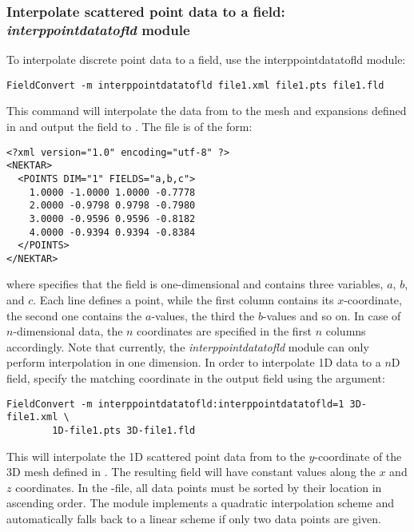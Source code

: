 \subsubsection{Interpolate scattered point data to a field: \textit{interppointdatatofld} module}
To interpolate discrete point data to a field, use the interppointdatatofld module:
%
\begin{lstlisting}[style=BashInputStyle]
FieldConvert -m interppointdatatofld file1.xml file1.pts file1.fld
\end{lstlisting}
%
This command will interpolate the data from  to the mesh
and expansions defined in  and output the field to .
The file  is of the form:
%
\begin{lstlisting}[style=XMLStyle]
<?xml version="1.0" encoding="utf-8" ?>
<NEKTAR>
  <POINTS DIM="1" FIELDS="a,b,c">
    1.0000 -1.0000 1.0000 -0.7778
    2.0000 -0.9798 0.9798 -0.7980
    3.0000 -0.9596 0.9596 -0.8182
    4.0000 -0.9394 0.9394 -0.8384
  </POINTS>
</NEKTAR>
\end{lstlisting}
%
where  specifies that the field is one-dimensional
and contains three variables, $a$, $b$, and $c$.
Each line defines a point, while the  first column contains its $x$-coordinate,
the second one contains the $a$-values, the third the $b$-values and so on.
In case of $n$-dimensional data, the $n$ coordinates are specified in the first $n$
columns accordingly.
Note that currently, the \textit{interppointdatatofld} module can only perform
interpolation in one dimension.
%
In order to interpolate 1D data to a $n$D field, specify the matching coordinate in
the output field using the  argument:
%
\begin{lstlisting}[style=BashInputStyle]
FieldConvert -m interppointdatatofld:interppointdatatofld=1 3D-file1.xml \
		1D-file1.pts 3D-file1.fld
\end{lstlisting}
%
This will interpolate the 1D scattered point data from  to the
$y$-coordinate of the 3D mesh defined in \inltt{3D-file1.xml}. The resulting field
will have constant values along the $x$ and $z$ coordinates.
In the -file, all data points must be sorted by their location in ascending order.
The module implements a quadratic interpolation scheme and automatically falls back to a
linear scheme if only two data points are given.
%
%
%
